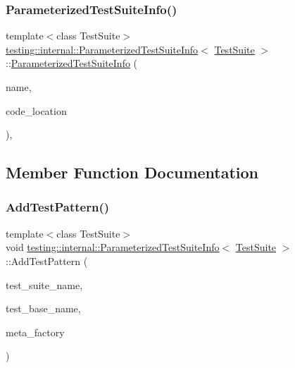 \subsubsection{\texorpdfstring{Parameterized\+Test\+Suite\+Info()}{ParameterizedTestSuiteInfo()}}
{\footnotesize\ttfamily template$<$class Test\+Suite$>$ \\
\hyperlink{classtesting_1_1internal_1_1ParameterizedTestSuiteInfo}{testing\+::internal\+::\+Parameterized\+Test\+Suite\+Info}$<$ \hyperlink{classtesting_1_1TestSuite}{Test\+Suite} $>$\+::\hyperlink{classtesting_1_1internal_1_1ParameterizedTestSuiteInfo}{Parameterized\+Test\+Suite\+Info} (\begin{DoxyParamCaption}\item[{const char $\ast$}]{name,  }\item[{\hyperlink{structtesting_1_1internal_1_1CodeLocation}{Code\+Location}}]{code\+\_\+location }\end{DoxyParamCaption})\hspace{0.3cm}{\ttfamily [inline]}, {\ttfamily [explicit]}}



\subsection{Member Function Documentation}
\mbox{\label{classtesting_1_1internal_1_1ParameterizedTestSuiteInfo_a07445ac68713383f38747e1c56c6a04a}} 
\subsubsection{\texorpdfstring{Add\+Test\+Pattern()}{AddTestPattern()}}
{\footnotesize\ttfamily template$<$class Test\+Suite$>$ \\
void \hyperlink{classtesting_1_1internal_1_1ParameterizedTestSuiteInfo}{testing\+::internal\+::\+Parameterized\+Test\+Suite\+Info}$<$ \hyperlink{classtesting_1_1TestSuite}{Test\+Suite} $>$\+::Add\+Test\+Pattern (\begin{DoxyParamCaption}\item[{const char $\ast$}]{test\+\_\+suite\+\_\+name,  }\item[{const char $\ast$}]{test\+\_\+base\+\_\+name,  }\item[{\hyperlink{classtesting_1_1internal_1_1TestMetaFactoryBase}{Test\+Meta\+Factory\+Base}$<$ \hyperlink{classtesting_1_1internal_1_1ParameterizedTestSuiteInfo_a10761bd750a6820a8d8d2c654b10fe54}{Param\+Type} $>$ $\ast$}]{meta\+\_\+factory }\end{DoxyParamCaption})\hspace{0.3cm}{\ttfamily [inline]}}

